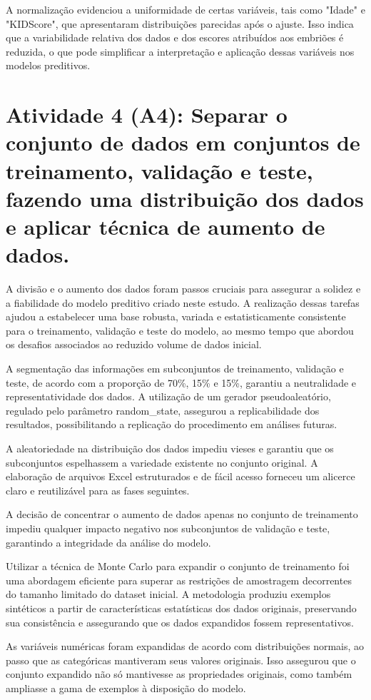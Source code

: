 A normalização evidenciou a uniformidade de certas variáveis, tais como "Idade" e "KIDScore", que apresentaram distribuições parecidas após o ajuste. Isso indica que a variabilidade relativa dos dados e dos escores atribuídos aos embriões é reduzida, o que pode simplificar a interpretação e aplicação dessas variáveis nos modelos preditivos.

\section{Atividade 4 (A4): Separar o conjunto de dados em conjuntos de treinamento, validação e teste, fazendo uma distribuição dos dados e aplicar técnica de aumento de dados.}

A divisão e o aumento dos dados foram passos cruciais para assegurar a solidez e a fiabilidade do modelo preditivo criado neste estudo. A realização dessas tarefas ajudou a estabelecer uma base robusta, variada e estatisticamente consistente para o treinamento, validação e teste do modelo, ao mesmo tempo que abordou os desafios associados ao reduzido volume de dados inicial.

A segmentação das informações em subconjuntos de treinamento, validação e teste, de acordo com a proporção de 70\%, 15\% e 15\%, garantiu a neutralidade e representatividade dos dados. A utilização de um gerador pseudoaleatório, regulado pelo parâmetro random\_state, assegurou a replicabilidade dos resultados, possibilitando a replicação do procedimento em análises futuras.

A aleatoriedade na distribuição dos dados impediu vieses e garantiu que os subconjuntos espelhassem a variedade existente no conjunto original. A elaboração de arquivos Excel estruturados e de fácil acesso forneceu um alicerce claro e reutilizável para as fases seguintes.

A decisão de concentrar o aumento de dados apenas no conjunto de treinamento impediu qualquer impacto negativo nos subconjuntos de validação e teste, garantindo a integridade da análise do modelo.

Utilizar a técnica de Monte Carlo para expandir o conjunto de treinamento foi uma abordagem eficiente para superar as restrições de amostragem decorrentes do tamanho limitado do dataset inicial. A metodologia produziu exemplos sintéticos a partir de características estatísticas dos dados originais, preservando sua consistência e assegurando que os dados expandidos fossem representativos.

As variáveis numéricas foram expandidas de acordo com distribuições normais, ao passo que as categóricas mantiveram seus valores originais. Isso assegurou que o conjunto expandido não só mantivesse as propriedades originais, como também ampliasse a gama de exemplos à disposição do modelo.

